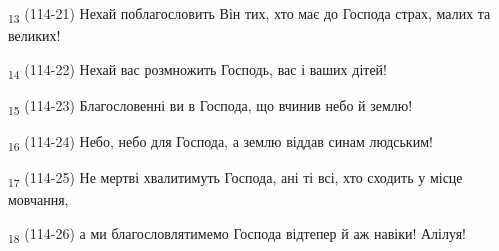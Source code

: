 \begin{tcolorbox}
\textsubscript{13} (114-21) Нехай поблагословить Він тих, хто має до Господа страх, малих та великих!
\end{tcolorbox}
\begin{tcolorbox}
\textsubscript{14} (114-22) Нехай вас розмножить Господь, вас і ваших дітей!
\end{tcolorbox}
\begin{tcolorbox}
\textsubscript{15} (114-23) Благословенні ви в Господа, що вчинив небо й землю!
\end{tcolorbox}
\begin{tcolorbox}
\textsubscript{16} (114-24) Небо, небо для Господа, а землю віддав синам людським!
\end{tcolorbox}
\begin{tcolorbox}
\textsubscript{17} (114-25) Не мертві хвалитимуть Господа, ані ті всі, хто сходить у місце мовчання,
\end{tcolorbox}
\begin{tcolorbox}
\textsubscript{18} (114-26) а ми благословлятимемо Господа відтепер й аж навіки! Алілуя!
\end{tcolorbox}
